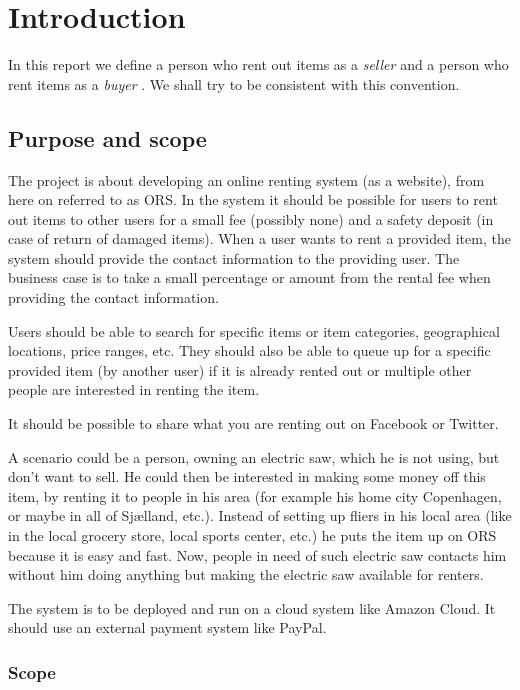\documentclass[a4paper,11pt]{report}
\newcommand{\seller}{ seller }
\newcommand{\buyer}{ buyer }
\begin{document}
%
%
\chapter{Introduction}
\label{cha:introduction}
\thispagestyle{fancy}

In this report we define a person who rent out items as a \textit{\seller} and a
person who rent items as a \textit{\buyer}. We shall try to be consistent with 
this convention.

\section{Purpose and scope}
\label{sec:purpose-scope}
The project is about developing an online renting system (as a website), from
here on referred to as ORS. In the system it should be possible for users to
rent out items to other users for a small fee (possibly none) and a safety
deposit (in case of return of damaged items). When a user wants to rent a
provided item, the system should provide the contact information to the
providing user. The business case is to take a small percentage or amount from
the rental fee when providing the contact information.

Users should be able to search for specific items or item categories,
geographical locations, price ranges, etc. They should also be able to queue up
for a specific provided item (by another user) if it is already rented out or
multiple other people are interested in renting the item.

It should be possible to share what you are renting out on Facebook or Twitter.

A scenario could be a person, owning an electric saw, which he is not using, but
don't want to sell. He could then be interested in making some money off this
item, by renting it to people in his area (for example his home city Copenhagen,
or maybe in all of Sjælland, etc.). Instead of setting up fliers in his local
area (like in the local grocery store, local sports center, etc.) he puts the
item up on ORS because it is easy and fast. Now, people in need of such electric
saw contacts him without him doing anything but making the electric saw
available for renters.

The system is to be deployed and run on a cloud system like Amazon Cloud. It
should use an external payment system like PayPal.

\subsection{Scope}
\end{document}
